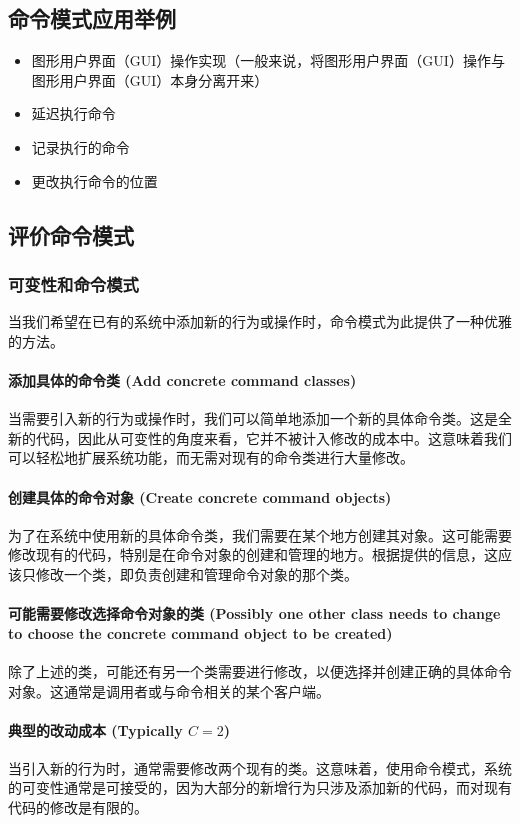 \subsection{命令模式应用举例}

\begin{itemize}
	\item 图形用户界面（GUI）操作实现（一般来说，将图形用户界面（GUI）操作与图形用户界面（GUI）本身分离开来）
	\item 延迟执行命令
	\item 记录执行的命令
	\item 更改执行命令的位置
\end{itemize}


\subsection{评价命令模式}
\subsubsection{可变性和命令模式}
当我们希望在已有的系统中添加新的行为或操作时，命令模式为此提供了一种优雅的方法。

\paragraph{添加具体的命令类 (Add concrete command classes)}当需要引入新的行为或操作时，我们可以简单地添加一个新的具体命令类。这是全新的代码，因此从可变性的角度来看，它并不被计入修改的成本中。这意味着我们可以轻松地扩展系统功能，而无需对现有的命令类进行大量修改。

\paragraph{创建具体的命令对象 (Create concrete command objects)}为了在系统中使用新的具体命令类，我们需要在某个地方创建其对象。这可能需要修改现有的代码，特别是在命令对象的创建和管理的地方。根据提供的信息，这应该只修改一个类，即负责创建和管理命令对象的那个类。

\paragraph{可能需要修改选择命令对象的类 (Possibly one other class needs to change to choose the concrete command object to be created)}
除了上述的类，可能还有另一个类需要进行修改，以便选择并创建正确的具体命令对象。这通常是调用者或与命令相关的某个客户端。

\paragraph{典型的改动成本 (Typically $C = 2$)}当引入新的行为时，通常需要修改两个现有的类。这意味着，使用命令模式，系统的可变性通常是可接受的，因为大部分的新增行为只涉及添加新的代码，而对现有代码的修改是有限的。

